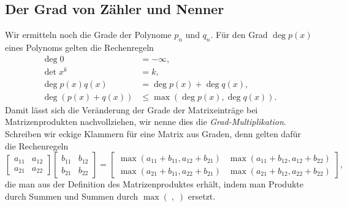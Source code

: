 \begin{refsection}
\subsection{Der Grad von Zähler und Nenner}
Wir ermitteln noch die Grade der Polynome $p_n$ und $q_n$.
Für den Grad $\deg p(x)$ eines Polynoms gelten die Rechenregeln
\begin{align*}
\deg 0&= -\infty,
\\
\det x^k&= k,
\\
\deg p(x) q(x) & = \deg p(x) + \deg q(x),
\\
\deg (p(x)+q(x)) &\le \max (\deg p(x),\deg q(x)).
\end{align*}
Damit lässt sich die Veränderung der Grade der Matrixeinträge bei
Matrizenprodukten nachvollziehen, wir nenne dies die {\em Grad-Multiplikation}.
Schreiben wir eckige Klammern für eine Matrix aus Graden, denn gelten
dafür die Rechenregeln
\[
\begin{bmatrix}
a_{11}&a_{12}\\
a_{21}&a_{22}
\end{bmatrix}
\begin{bmatrix}
b_{11}&b_{12}\\
b_{21}&b_{22}
\end{bmatrix}
=
\begin{bmatrix}
\max (a_{11} + b_{11}, a_{12}+b_{21})&\max (a_{11} + b_{12}, a_{12}+b_{22})\\
\max (a_{21} + b_{11}, a_{22}+b_{21})&\max (a_{21} + b_{12}, a_{22}+b_{22})
\end{bmatrix},
\]
die man aus der Definition des Matrizenproduktes erhält, indem man Produkte
durch Summen und Summen durch $\max(\;,\;)$ ersetzt.


\end{refsection}
